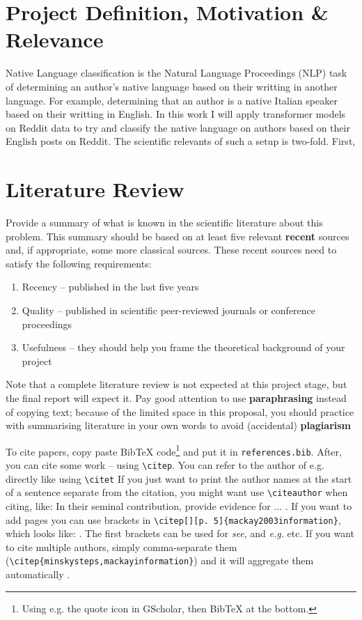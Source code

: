 \documentclass[11pt, a4paper]{article}
\begin{document}


\section{Project Definition, Motivation \& Relevance} \label{sec:introduction}
Native Language classification is the Natural Language Proceedings (NLP) task of determining an author's native language based on their writting in another language. For example, determining that an author is a native Italian speaker based on their writting in English. 
In this work I will apply transformer models on Reddit data to try and classify the native language on authors based on their English posts on Reddit. 
The scientific relevants of such a setup is two-fold. First, 
\section{Literature Review}
Provide a summary of what is known in the scientific literature about this problem. This summary should be based on at least five relevant \textbf{recent} sources and, if appropriate, some more classical sources. These recent sources need to satisfy the following requirements: 
\begin{enumerate}
    \item Recency – published in the last five years
    \item Quality – published in scientific peer-reviewed journals or conference proceedings
    \item Usefulness – they should help you frame the theoretical background of your project
\end{enumerate}
Note that a complete literature review is not expected at this project stage, but the final report will expect it. Pay good attention to use  \textbf{paraphrasing} instead of copying text; because of the limited space in this proposal, you should practice with summarising literature in your own words to avoid (accidental) \textbf{plagiarism}

To cite papers, copy paste BibTeX code\footnote{Using e.g. the quote icon in GScholar, then BibTeX at the bottom.} and put it in \texttt{references.bib}. After, you can cite some work \citep{mackay2003information} -- using \texttt{\textbackslash citep}. You can refer to the author of e.g. \citet{minsky1961steps} directly like using \texttt{\textbackslash citet} If you just want to print the author names at the start of a sentence separate from the citation, you might want use \texttt{\textbackslash citeauthor} when citing, like: In their seminal contribution,  \citeauthor{ananny2018seeing} provide evidence for ... \citep{ananny2018seeing}. If you want to add pages you can use brackets in \texttt{\textbackslash citep[][p. 5]\{mackay2003information\}}, which looks like: \citep[][p. 5]{mackay2003information}. The first brackets can be used for \emph{see}, and \emph{e.g.} etc. If you want to cite multiple authors, simply comma-separate them (\texttt{\textbackslash citep\{\-minsky\-steps,\-mackay\-information\}}) and it will aggregate them automatically \citep{minsky1961steps,mackay2003information}.
\end{document}
